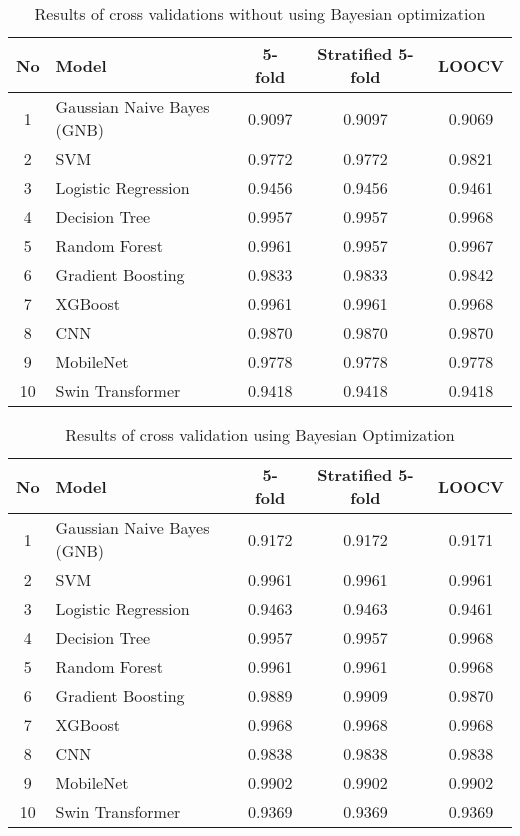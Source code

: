 \documentclass[runningheads]{llncs}
\begin{document}
\begin{table}[ht]
\caption{Results of cross validations without using Bayesian optimization}
\centering
\begin{tabular}{|c|l|c|c|c|}
\hline
\textbf{No} & \textbf{Model} & \textbf{5-fold} & \textbf{Stratified 5-fold} & \textbf{LOOCV} \\
\hline
1 & Gaussian Naive Bayes (GNB) & 0.9097 & 0.9097 & 0.9069 \\
2 & SVM & 0.9772 & 0.9772 & 0.9821 \\
3 & Logistic Regression & 0.9456 & 0.9456 & 0.9461 \\
4 & Decision Tree & 0.9957 & 0.9957 & 0.9968 \\
5 & Random Forest & 0.9961 & 0.9957 & 0.9967 \\
6 & Gradient Boosting & 0.9833 & 0.9833 & 0.9842 \\
7 & XGBoost & 0.9961 & 0.9961 & 0.9968 \\
8 & CNN & 0.9870 & 0.9870 & 0.9870 \\
9 & MobileNet & 0.9778 & 0.9778 & 0.9778 \\
10 & Swin Transformer & 0.9418 & 0.9418 & 0.9418 \\
\hline
\end{tabular}
\label{tab:validation_comparison}
\end{table}

\begin{table}[ht]
\caption{Results of cross validation using Bayesian Optimization}
\centering
\begin{tabular}{|c|l|c|c|c|}
\hline
\textbf{No} & \textbf{Model} & \textbf{5-fold } & \textbf{Stratified 5-fold} & \textbf{LOOCV} \\
\hline
1 & Gaussian Naive Bayes (GNB) & 0.9172 & 0.9172 & 0.9171 \\
2 & SVM & 0.9961 & 0.9961 & 0.9961 \\
3 & Logistic Regression & 0.9463 & 0.9463 & 0.9461 \\
4 & Decision Tree & 0.9957 & 0.9957 & 0.9968 \\
5 & Random Forest & 0.9961 & 0.9961 & 0.9968 \\
6 & Gradient Boosting & 0.9889 & 0.9909 & 0.9870 \\
7 & XGBoost & 0.9968 & 0.9968 & 0.9968 \\
8 & CNN & 0.9838 & 0.9838 & 0.9838 \\
9 & MobileNet & 0.9902 & 0.9902 & 0.9902 \\
10 & Swin Transformer & 0.9369 & 0.9369 & 0.9369 \\
\hline
\end{tabular}

\label{tab:model_cv_comparison}
\end{table}
\end{document}

